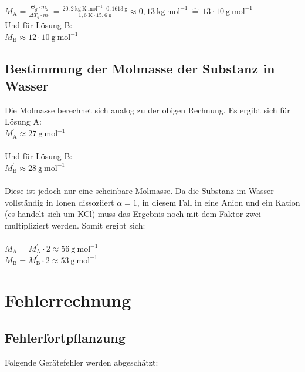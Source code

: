 \documentclass[12pt,a4paper,titlepage,headinclude,bibtotoc]{scrartcl}
\begin{document}
$M_\mathrm{A} = \frac { \mathit{\Theta} _g \cdot m_2 }{ \Delta T_g\cdot m_1} 
 = \frac {20,2{~} \mathrm{kg{~}K {~} mol^{-1}} \cdot 0,1613 {~}\text{g}} { 1,6 {~} \mathrm{K} \cdot 15,6{~} \mathrm{g}} \approx 0,13{~} \mathrm{kg {~} mol^{-1}} {~}\widehat{=}{~} 13 \cdot 10{~} \mathrm{g{~}mol^{-1}} $\\

Und für Lösung B:\\

$M_\mathrm{B} \approx 12 \cdot 10{~} \mathrm{g{~}mol^{-1}}$


\subsection{Bestimmung der Molmasse der Substanz in Wasser}

Die Molmasse berechnet sich analog zu der obigen Rechnung. Es ergibt sich für Lösung A:\\
$M_\mathrm{A}^{'} \approx 27{~} \mathrm{g{~}mol^{-1}}$\\\\
Und für Lösung B:\\
$M_\mathrm{B}^{'} \approx 28{~} \mathrm{g{~}mol^{-1}}$\\\\

Diese ist jedoch nur eine scheinbare Molmasse. Da die Substanz im Wasser vollständig  in Ionen dissoziiert $\alpha = 1$, in diesem Fall in eine Anion und ein Kation (es handelt sich um KCl) muss das Ergebnis noch mit dem Faktor zwei multipliziert werden. Somit ergibt sich:\\\\
$M_\mathrm{A} = M_\mathrm{A}^{'} \cdot 2 \approx 56{~} \mathrm{g{~}mol^{-1}} $\\
$M_\mathrm{B} = M_\mathrm{B}^{'} \cdot 2 \approx 53{~} \mathrm{g{~}mol^{-1}} $\\

\section{Fehlerrechnung}
\subsection{Fehlerfortpflanzung}
Folgende Gerätefehler werden abgeschätzt:\\
\end{document}
